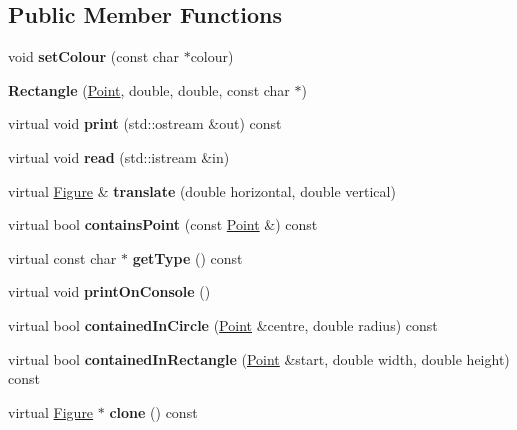 \subsection*{Public Member Functions}
\begin{DoxyCompactItemize}
\item 
\mbox{\label{class_rectangle_af13949195c8b5c9cbf07e9c91897f865}} 
void {\bfseries set\+Colour} (const char $\ast$colour)
\item 
\mbox{\label{class_rectangle_a4c79aba064402d316af0f29ef6879a51}} 
{\bfseries Rectangle} (\mbox{\hyperlink{struct_point}{Point}}, double, double, const char $\ast$)
\item 
\mbox{\label{class_rectangle_a8843c245e9a21f82cc4c4d5a56ef2693}} 
virtual void {\bfseries print} (std\+::ostream \&out) const
\item 
\mbox{\label{class_rectangle_ab4d9cf3bfc7fc1948dac9a6dddf92e03}} 
virtual void {\bfseries read} (std\+::istream \&in)
\item 
\mbox{\label{class_rectangle_a943e5e919539fcd0d7373c1bb082ec6a}} 
virtual \mbox{\hyperlink{class_figure}{Figure}} \& {\bfseries translate} (double horizontal, double vertical)
\item 
\mbox{\label{class_rectangle_a53468b6af27f0a13acbddaeeeb817142}} 
virtual bool {\bfseries contains\+Point} (const \mbox{\hyperlink{struct_point}{Point}} \&) const
\item 
\mbox{\label{class_rectangle_a446866f44d9ec746a5ad6ac04105ad57}} 
virtual const char $\ast$ {\bfseries get\+Type} () const
\item 
\mbox{\label{class_rectangle_a537bdc01040e0b843b659f83e1893b35}} 
virtual void {\bfseries print\+On\+Console} ()
\item 
\mbox{\label{class_rectangle_adaa8d624e4ae9192cba3b10e08aa2274}} 
virtual bool {\bfseries contained\+In\+Circle} (\mbox{\hyperlink{struct_point}{Point}} \&centre, double radius) const
\item 
\mbox{\label{class_rectangle_a922a79caa4f13fb002903cbc1ea09a82}} 
virtual bool {\bfseries contained\+In\+Rectangle} (\mbox{\hyperlink{struct_point}{Point}} \&start, double width, double height) const
\item 
\mbox{\label{class_rectangle_a51be4621bd71b7f533888e26f963cefa}} 
virtual \mbox{\hyperlink{class_figure}{Figure}} $\ast$ {\bfseries clone} () const
\end{DoxyCompactItemize}


